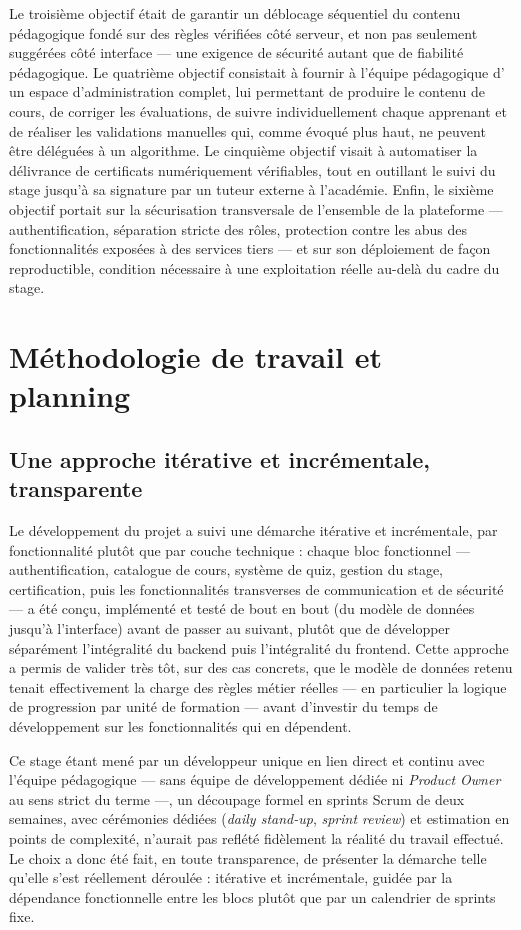 Le troisième objectif était de garantir un déblocage séquentiel du contenu
pédagogique fondé sur des règles vérifiées côté serveur, et non pas
seulement suggérées côté interface --- une exigence de sécurité autant que
de fiabilité pédagogique. Le quatrième objectif consistait à fournir à
l'équipe pédagogique d'\Entreprise{} un espace d'administration complet,
lui permettant de produire le contenu de cours, de corriger les
évaluations, de suivre individuellement chaque apprenant et de réaliser les
validations manuelles qui, comme évoqué plus haut, ne peuvent être
déléguées à un algorithme. Le cinquième objectif visait à automatiser la
délivrance de certificats numériquement vérifiables, tout en outillant le
suivi du stage jusqu'à sa signature par un tuteur externe à l'académie.
Enfin, le sixième objectif portait sur la sécurisation transversale de
l'ensemble de la plateforme --- authentification, séparation stricte des
rôles, protection contre les abus des fonctionnalités exposées à des
services tiers --- et sur son déploiement de façon reproductible, condition
nécessaire à une exploitation réelle au-delà du cadre du stage.

\section{Méthodologie de travail et planning}

\subsection{Une approche itérative et incrémentale, transparente}

Le développement du projet a suivi une démarche itérative et incrémentale,
par fonctionnalité plutôt que par couche technique : chaque bloc
fonctionnel --- authentification, catalogue de cours, système de quiz,
gestion du stage, certification, puis les fonctionnalités transverses de
communication et de sécurité --- a été conçu, implémenté et testé de bout
en bout (du modèle de données jusqu'à l'interface) avant de passer au
suivant, plutôt que de développer séparément l'intégralité du backend puis
l'intégralité du frontend. Cette approche a permis de valider très tôt,
sur des cas concrets, que le modèle de données retenu tenait effectivement
la charge des règles métier réelles --- en particulier la logique de
progression par unité de formation --- avant d'investir du temps de
développement sur les fonctionnalités qui en dépendent.

Ce stage étant mené par un développeur unique en lien direct et continu
avec l'équipe pédagogique --- sans équipe de développement dédiée ni
\textit{Product Owner} au sens strict du terme ---, un découpage formel en
sprints Scrum de deux semaines, avec cérémonies dédiées (\textit{daily
stand-up}, \textit{sprint review}) et estimation en points de complexité,
n'aurait pas reflété fidèlement la réalité du travail effectué. Le choix a
donc été fait, en toute transparence, de présenter la démarche telle
qu'elle s'est réellement déroulée : itérative et incrémentale, guidée par
la dépendance fonctionnelle entre les blocs plutôt que par un calendrier
de sprints fixe.

